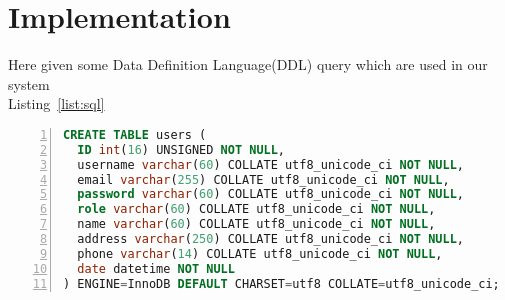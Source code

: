 \section{Implementation}\label{sec:imp}
Here given some Data Definition Language(DDL) query which are used in our system\\
Listing~\ref{list:sql}   
\begin{lstlisting}[caption={ A SQL command for Creating table named USERS}, label=list:sql, captionpos=b,
           backgroundcolor=\color{white},
           language=SQL,
           breaklines=true,
           frame=single,
           showspaces=false,
           basicstyle=\ttfamily,
           numbers=left,
           numberstyle=\tiny,
           rulecolor=\color{red},
           keywordstyle=\color{blue},
           commentstyle=\color{gray}
        ]
CREATE TABLE users (
  ID int(16) UNSIGNED NOT NULL,
  username varchar(60) COLLATE utf8_unicode_ci NOT NULL,
  email varchar(255) COLLATE utf8_unicode_ci NOT NULL,
  password varchar(60) COLLATE utf8_unicode_ci NOT NULL,
  role varchar(60) COLLATE utf8_unicode_ci NOT NULL,
  name varchar(60) COLLATE utf8_unicode_ci NOT NULL,
  address varchar(250) COLLATE utf8_unicode_ci NOT NULL,
  phone varchar(14) COLLATE utf8_unicode_ci NOT NULL,
  date datetime NOT NULL
) ENGINE=InnoDB DEFAULT CHARSET=utf8 COLLATE=utf8_unicode_ci;
\end{lstlisting}

